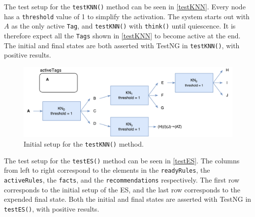 \documentclass[titlepage,11pt]{article}
\newcommand{\code}[1]{\texttt{#1}}
\begin{document}
The test setup for the \code{testKNN()} method can be seen in \autoref{testKNN}. Every node has a \code{threshold} value of 1 to simplify the activation. The system starts out with $A$ as the only active \code{Tag}, and \code{testKNN()} with \code{think()} until quiescence. It is therefore expect all the \code{Tags} shown in \autoref{testKNN} to become active at the end. The initial and final states are both asserted with TestNG in \code{testKNN()}, with positive results.

\begin{figure}[!htb]
	\includegraphics[width=\textwidth]{figures/testKNN.pdf}
	\caption[Setup for the \code{testKNN()} method.]
	{Initial setup for the \code{testKNN()} method.}
	\label{testKNN}
\end{figure}

The test setup for the \code{testES()} method can be seen in \autoref{testES}. The columns from left to right correspond to the elements in the \code{readyRules}, the \code{activeRules}, the \code{facts}, and the \code{recommendations} respectively. The first row corresponds to the initial setup of the ES, and the last row corresponds to the expended final state. Both the initial and final states are asserted with TestNG in \code{testES()}, with positive results.
\end{document}
